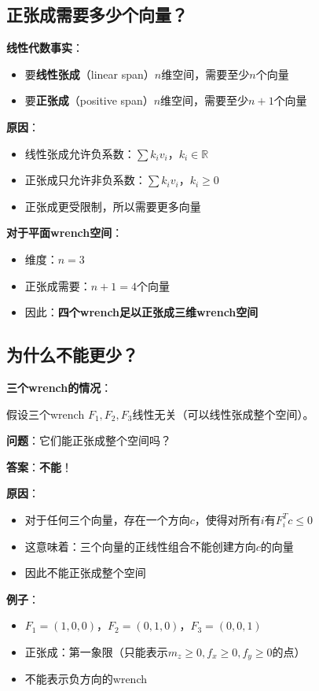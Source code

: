 \documentclass[12pt,a4paper]{article}
\begin{document}
\subsection{正张成需要多少个向量？}

\textbf{线性代数事实}：
\begin{itemize}
\item 要\textbf{线性张成}（linear span）$n$维空间，需要至少$n$个向量
\item 要\textbf{正张成}（positive span）$n$维空间，需要至少$n+1$个向量
\end{itemize}

\textbf{原因}：
\begin{itemize}
\item 线性张成允许负系数：$\sum k_i v_i$，$k_i \in \mathbb{R}$
\item 正张成只允许非负系数：$\sum k_i v_i$，$k_i \geq 0$
\item 正张成更受限制，所以需要更多向量
\end{itemize}

\textbf{对于平面wrench空间}：
\begin{itemize}
\item 维度：$n = 3$
\item 正张成需要：$n + 1 = 4$个向量
\item 因此：\textbf{四个wrench足以正张成三维wrench空间}
\end{itemize}

\subsection{为什么不能更少？}

\textbf{三个wrench的情况}：

假设三个wrench $F_1, F_2, F_3$线性无关（可以线性张成整个空间）。

\textbf{问题}：它们能正张成整个空间吗？

\textbf{答案}：\textbf{不能}！

\textbf{原因}：
\begin{itemize}
\item 对于任何三个向量，存在一个方向$c$，使得对所有$i$有$F_i^T c \leq 0$
\item 这意味着：三个向量的正线性组合不能创建方向$c$的向量
\item 因此不能正张成整个空间
\end{itemize}

\textbf{例子}：
\begin{itemize}
\item $F_1 = (1, 0, 0)$，$F_2 = (0, 1, 0)$，$F_3 = (0, 0, 1)$
\item 正张成：第一象限（只能表示$m_z \geq 0, f_x \geq 0, f_y \geq 0$的点）
\item 不能表示负方向的wrench
\end{itemize}
\end{document}
